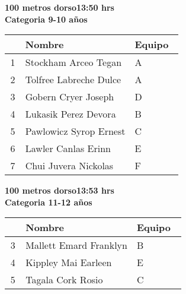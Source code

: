 \begin{minipage}{0.95\linewidth}\vspace{0.5cm} 
\begin{flushleft}
\textbf{
\hspace{-0.15cm}100 metros dorso\hspace{1.5cm}13:50 hrs \\Categoria 9-10 años}\vspace{-0.2cm} 
\end{flushleft}
\begin{tabular}{cp{0.63\linewidth}l}
\hline
& \textbf{Nombre} & \textbf{Equipo} \\ \hline
1 & Stockham Arceo Tegan & A \\ 
2 & Tolfree Labreche Dulce & A \\ 
3 & Gobern Cryer Joseph & D \\ 
4 & Lukasik Perez Devora & B \\ 
5 & Pawlowicz Syrop Ernest & C \\ 
6 & Lawler Canlas Erinn & E \\ 
7 & Chui Juvera Nickolas & F \\ 
\end{tabular}
\end{minipage}
\begin{minipage}{0.95\linewidth}\vspace{0.5cm} 
\begin{flushleft}
\textbf{
\hspace{-0.15cm}100 metros dorso\hspace{1.5cm}13:53 hrs \\Categoria 11-12 años}\vspace{-0.2cm} 
\end{flushleft}
\begin{tabular}{cp{0.63\linewidth}l}
\hline
& \textbf{Nombre} & \textbf{Equipo} \\ \hline
3 & Mallett Emard Franklyn & B \\ 
4 & Kippley Mai Earleen & E \\ 
5 & Tagala Cork Rosio & C \\ 
\end{tabular}
\end{minipage}
